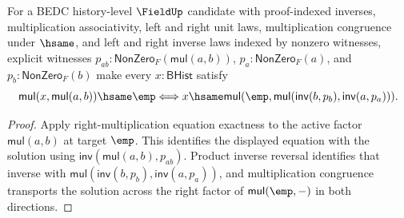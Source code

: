 \begin{theorem}
\label{thm:field-product-right-mul-empty-equation-exact-from-apartness}
For a BEDC history-level $\FieldUp$ candidate with proof-indexed inverses,
multiplication associativity, left and right unit laws, multiplication
congruence under $\hsame$, and left and right inverse laws indexed by nonzero
witnesses, explicit witnesses
$p_{ab}:\mathsf{NonZero}_F(\mathsf{mul}(a,b))$,
$p_a:\mathsf{NonZero}_F(a)$, and $p_b:\mathsf{NonZero}_F(b)$ make every
$x:\mathsf{BHist}$ satisfy
$$
\mathsf{mul}(x,\mathsf{mul}(a,b))\hsame \emp
\Longleftrightarrow
x\hsame
\mathsf{mul}(\emp,\mathsf{mul}(\mathsf{inv}(b,p_b),\mathsf{inv}(a,p_a))).
$$
\end{theorem}
\begin{proof}
Apply right-multiplication equation exactness to the active factor
$\mathsf{mul}(a,b)$ at target $\emp$. This identifies the displayed equation
with the solution using $\mathsf{inv}(\mathsf{mul}(a,b),p_{ab})$. Product
inverse reversal identifies that inverse with
$\mathsf{mul}(\mathsf{inv}(b,p_b),\mathsf{inv}(a,p_a))$, and multiplication
congruence transports the solution across the right factor of
$\mathsf{mul}(\emp,-)$ in both directions.
\end{proof}


